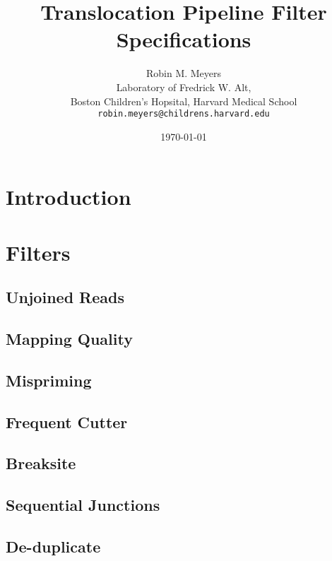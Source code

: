 \documentclass{article}
\begin{document}
\title{Translocation Pipeline Filter Specifications}
\author{Robin M. Meyers\\
  Laboratory of Fredrick W. Alt,\\
  Boston Children's Hopsital, Harvard Medical School\\
  \texttt{robin.meyers@childrens.harvard.edu}}
\date{\today}
\maketitle

\begin{abstract}

\end{abstract}


\section{Introduction}

\section{Filters}
\subsection*{Unjoined Reads}

\subsection*{Mapping Quality}

\subsection*{Mispriming}

\subsection*{Frequent Cutter}

\subsection*{Breaksite}

\subsection*{Sequential Junctions}

\subsection*{De-duplicate}
\end{document}
